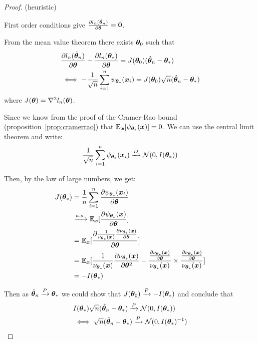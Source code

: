 \begin{proof}
  (heuristic)

  First order conditions give $\partialfrac{\thetab}{l_n(\hat{\thetab}_n)} = \bzero$.

  From the mean value theorem there exists $\thetab_0$ such that
  \begin{align}
    &\partialfrac{\thetab}{l_n(\hat{\thetab}_n)} - \partialfrac{\thetab}{l_n(\thetab_*)} = J(\thetab_0)(\hat{\thetab}_n - \thetab_*) \\
    &\iff -\frac1{\sqrt{n}} \sum_{i=1}^n  \psi_{\thetab_*}(\xb_i) = J(\thetab_0)\sqrt{n}(\hat{\thetab}_n - \thetab_*)
  \end{align}
  where $J(\thetab) = \grad^2 l_n(\thetab)$.

  Since we know from the proof of the Cramer-Rao bound
  (proposition~\ref{prop:cramerrao}) that $\EE_{\xb} [\psi_{\thetab_*}(\xb)]=
  0$.  We can use the central limit theorem and write:
  \begin{align}
  \frac1{\sqrt{n}} \sum_{i=1}^n  \psi_{\thetab_*}(\xb_i) \xrightarrow[]{D}
  \Ncal(0, I(\thetab_*))
  \end{align}

  Then, by the law of large numbers, we get:
  \begin{align}
  J(\thetab_*) &= \frac1{n} \sum_{i=1}^n \partialfrac{\thetab}{ \psi_{\thetab_*}(\xb_i)}  \\
                &\xrightarrow[]{a.s.} \EE_{\xb}[\partialfrac{\thetab}{\psi_{\thetab_*}(\xb)}] \\
              &=  \EE_{\xb} [\partialfrac{\thetab}{ \frac1{\nu_{\thetab_*}(\xb)} \partialfrac{\thetab}{ \nu_{\thetab_*}(\xb)}} ] \\
              &= \EE_{\xb}[\frac1{\nu_{\thetab_*}(\xb)} \partialfrac{\thetab^2}{ \nu_{\thetab_*}(\xb)}-\frac{\partialfrac{\thetab}{ \nu_{\thetab_*}(\xb)}}{\nu_{\thetab_*}(\xb)}  \times  \frac{\partialfrac{\thetab}{\nu_{\thetab_*}(\xb)}}{\nu_{\thetab_*}(\xb)}  ] \\
              &= - I(\thetab_*) \\
  \end{align}

  Then as $\hat{\thetab}_n \xrightarrow[]{P} \thetab_*$ we could show that
  $J(\thetab_0) \xrightarrow[]{P} -I(\thetab_*)$ and conclude that
  \begin{align}
    &I(\thetab_*) \sqrt{n}(\hat{\thetab}_n - \thetab_*) \xrightarrow[]{P}\Ncal(0, I(\thetab_*)) \\
    &\iff \sqrt{n}(\hat{\thetab}_n - \thetab_*) \xrightarrow[]{P}\Ncal(0, I(\thetab_*)^{-1})
  \end{align}
\end{proof}

